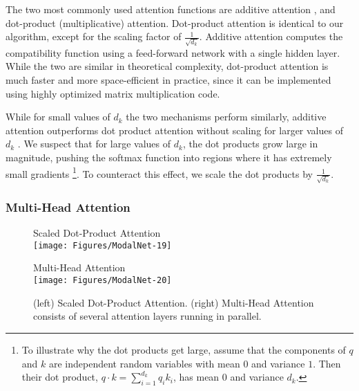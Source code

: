   The two most commonly used attention functions are additive attention \citep{bahdanau2014neural}, and dot-product (multiplicative) attention.  Dot-product attention is identical to our algorithm, except for the scaling factor of $\frac{1}{\sqrt{d_k}}$. Additive attention computes the compatibility function using a feed-forward network with a single hidden layer.  While the two are similar in theoretical complexity, dot-product attention is much faster and more space-efficient in practice, since it can be implemented using highly optimized matrix multiplication code. 
  
  While for small values of $d_k$ the two mechanisms perform similarly, additive attention outperforms dot product attention without scaling for larger values of $d_k$ \citep{DBLP:journals/corr/BritzGLL17}. We suspect that for large values of $d_k$, the dot products grow large in magnitude, pushing the softmax function into regions where it has extremely small gradients  \footnote{To illustrate why the dot products get large, assume that the components of $q$ and $k$ are independent random variables with mean $0$ and variance $1$.  Then their dot product, $q \cdot k = \sum_{i=1}^{d_k} q_ik_i$, has mean $0$ and variance $d_k$.}. To counteract this effect, we scale the dot products by $\frac{1}{\sqrt{d_k}}$.
  
  
  \subsubsection{Multi-Head Attention} \label{sec:multihead}
  
  \begin{figure}
  \begin{minipage}[t]{0.5\textwidth}
    \centering
    Scaled Dot-Product Attention \\
    \vspace{0.5cm}
    \texttt{[image: Figures/ModalNet-19]}
  \end{minipage}
  \begin{minipage}[t]{0.5\textwidth}
    \centering 
    Multi-Head Attention \\
    \vspace{0.1cm}
    \texttt{[image: Figures/ModalNet-20]}  
  \end{minipage}
  
  
    \caption{(left) Scaled Dot-Product Attention. (right) Multi-Head Attention consists of several attention layers running in parallel.}
    \label{fig:multi-head-att}
  \end{figure}
  
